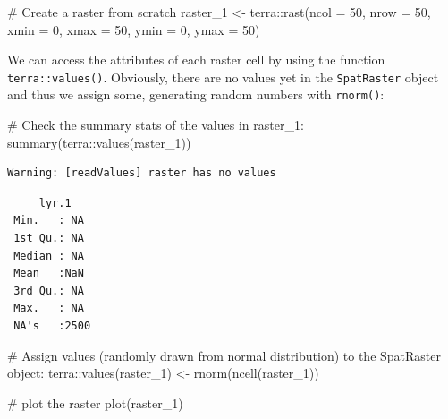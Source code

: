 \documentclass[
]{book}
\newenvironment{Shaded}{\begin{snugshade}}{\end{snugshade}}
\newcommand{\AttributeTok}[1]{\textcolor[rgb]{0.40,0.45,0.13}{#1}}
\newcommand{\CommentTok}[1]{\textcolor[rgb]{0.37,0.37,0.37}{#1}}
\newcommand{\DecValTok}[1]{\textcolor[rgb]{0.68,0.00,0.00}{#1}}
\newcommand{\FunctionTok}[1]{\textcolor[rgb]{0.28,0.35,0.67}{#1}}
\newcommand{\NormalTok}[1]{\textcolor[rgb]{0.00,0.23,0.31}{#1}}
\newcommand{\OtherTok}[1]{\textcolor[rgb]{0.00,0.23,0.31}{#1}}
\newcommand{\SpecialCharTok}[1]{\textcolor[rgb]{0.37,0.37,0.37}{#1}}
\begin{document}
\begin{Shaded}
\begin{Highlighting}[]
\CommentTok{\# Create a raster from scratch}
\NormalTok{raster\_1 }\OtherTok{\textless{}{-}}\NormalTok{ terra}\SpecialCharTok{::}\FunctionTok{rast}\NormalTok{(}\AttributeTok{ncol =} \DecValTok{50}\NormalTok{, }\AttributeTok{nrow =} \DecValTok{50}\NormalTok{, }\AttributeTok{xmin =} \DecValTok{0}\NormalTok{, }\AttributeTok{xmax =} \DecValTok{50}\NormalTok{,  }\AttributeTok{ymin =} \DecValTok{0}\NormalTok{, }\AttributeTok{ymax =} \DecValTok{50}\NormalTok{)}
\end{Highlighting}
\end{Shaded}

We can access the attributes of each raster cell by using the function
\texttt{terra::values()}. Obviously, there are no values yet in the
\texttt{SpatRaster} object and thus we assign some, generating random
numbers with \texttt{rnorm()}:

\begin{Shaded}
\begin{Highlighting}[]
\CommentTok{\# Check the summary stats of the values in raster\_1:}
\FunctionTok{summary}\NormalTok{(terra}\SpecialCharTok{::}\FunctionTok{values}\NormalTok{(raster\_1))}
\end{Highlighting}
\end{Shaded}

\begin{verbatim}
Warning: [readValues] raster has no values
\end{verbatim}

\begin{verbatim}
     lyr.1     
 Min.   : NA   
 1st Qu.: NA   
 Median : NA   
 Mean   :NaN   
 3rd Qu.: NA   
 Max.   : NA   
 NA's   :2500  
\end{verbatim}

\begin{Shaded}
\begin{Highlighting}[]
\CommentTok{\# Assign values (randomly drawn from normal distribution) to the SpatRaster object:}
\NormalTok{terra}\SpecialCharTok{::}\FunctionTok{values}\NormalTok{(raster\_1) }\OtherTok{\textless{}{-}} \FunctionTok{rnorm}\NormalTok{(}\FunctionTok{ncell}\NormalTok{(raster\_1))}

\CommentTok{\# plot the raster}
\FunctionTok{plot}\NormalTok{(raster\_1)}
\end{Highlighting}
\end{Shaded}
\end{document}
